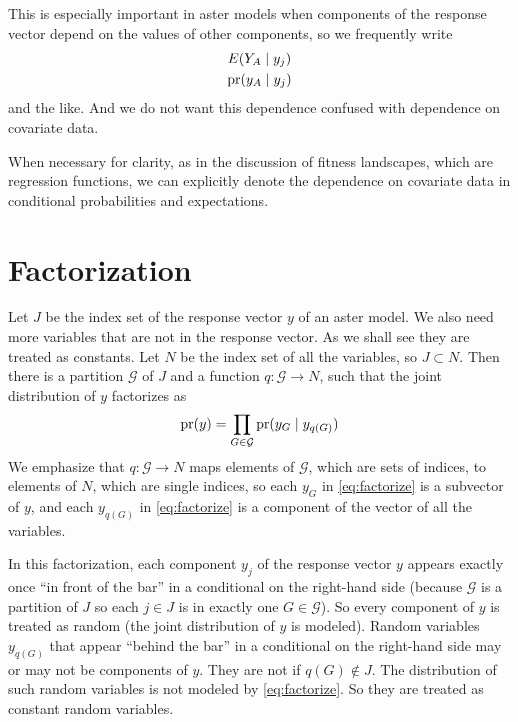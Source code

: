 This is especially important in aster models when components of the response
vector depend on the values of other components, so we frequently write
\begin{gather*}
   E(Y_A \mid y_j)
   \\
   \operatorname{pr}(y_A \mid y_j)
\end{gather*}
and the like.  And we do not want this dependence confused with dependence
on covariate data.

When necessary for clarity, as in the discussion of fitness landscapes,
which are regression functions,
we can explicitly denote the dependence on covariate data in conditional
probabilities and expectations.

\section{Factorization}
\label{sec:factorization}

Let $J$ be the index set of the response vector $y$ of an aster model.
We also need more variables that are not in the response vector.
As we shall see they are treated as constants.
Let $N$ be the index set of all the variables, so $J \subset N$.
Then there is a partition $\mathcal{G}$ of $J$
and a function $q : \mathcal{G} \to N$, such that
the joint distribution of $y$ factorizes as
\begin{equation} \label{eq:factorize}
   \operatorname{pr}(y) = \prod_{G \in \mathcal{G}} \operatorname{pr}(y_G \mid y_{q(G)})
\end{equation}
We emphasize that $q : \mathcal{G} \to N$ maps elements of $\mathcal{G}$,
which are sets of indices, to elements of $N$, which are single indices,
so each $y_G$ in \eqref{eq:factorize} is a subvector of $y$,
and each $y_{q(G)}$ in \eqref{eq:factorize} is a component of the vector
of all the variables.

In this factorization, each component $y_j$ of the response vector $y$
appears exactly once ``in front of the bar'' in a conditional on
the right-hand side (because $\mathcal{G}$ is a partition of $J$ so
each $j \in J$ is in exactly one $G \in \mathcal{G}$).
So every component of $y$ is treated as random (the joint distribution
of $y$ is modeled).
Random variables $y_{q(G)}$ that appear ``behind the bar'' in a conditional
on the right-hand side may or may not be components of $y$.  They are not
if $q(G) \notin J$.  The distribution of such random variables is not
modeled by \eqref{eq:factorize}.  So they are treated as constant random
variables.

